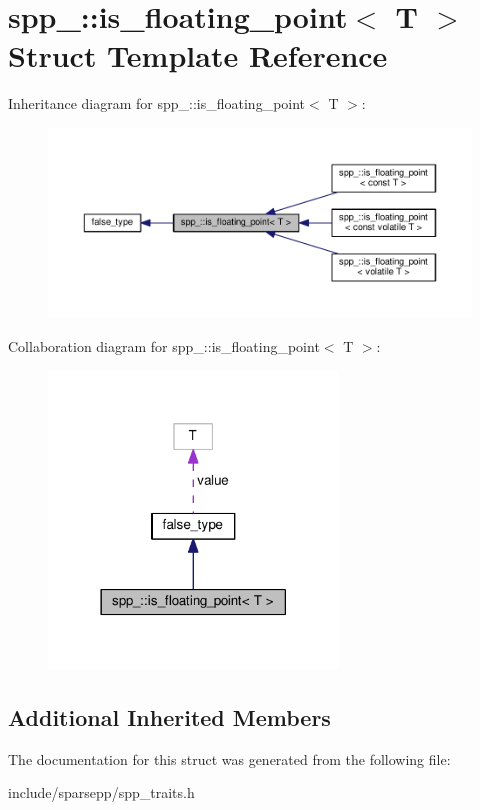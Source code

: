 \hypertarget{structspp___1_1is__floating__point}{}\section{spp\+\_\+\+:\+:is\+\_\+floating\+\_\+point$<$ T $>$ Struct Template Reference}
\label{structspp___1_1is__floating__point}


Inheritance diagram for spp\+\_\+\+:\+:is\+\_\+floating\+\_\+point$<$ T $>$\+:\nopagebreak
\begin{figure}[H]
\begin{center}
\leavevmode
\includegraphics[width=350pt]{structspp___1_1is__floating__point__inherit__graph}
\end{center}
\end{figure}


Collaboration diagram for spp\+\_\+\+:\+:is\+\_\+floating\+\_\+point$<$ T $>$\+:\nopagebreak
\begin{figure}[H]
\begin{center}
\leavevmode
\includegraphics[width=218pt]{structspp___1_1is__floating__point__coll__graph}
\end{center}
\end{figure}
\subsection*{Additional Inherited Members}


The documentation for this struct was generated from the following file\+:\begin{DoxyCompactItemize}
\item 
include/sparsepp/spp\+\_\+traits.\+h\end{DoxyCompactItemize}

